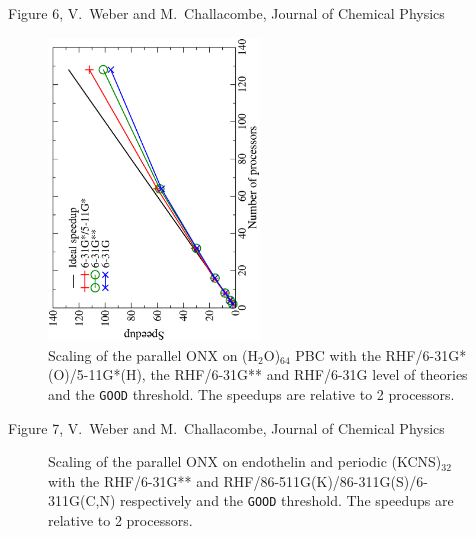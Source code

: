 \documentclass[prl,preprint,doublespace]{revtex4} %
\begin{document}
{\begin{figure}[h]
\end{figure}

\clearpage
Figure 6, V.~Weber  and M.~Challacombe, Journal of Chemical Physics \\[1.cm]
\begin{figure}[h]
  \caption{\protect
    Scaling of the parallel ONX on (H$_2$O)$_{64}$ PBC with the RHF/6-31G*(O)/5-11G*(H),
    the RHF/6-31G** and RHF/6-31G level of theories and the {\tt GOOD} threshold.
    The speedups are relative to 2 processors.
  }\label{fig:h2o_pbc_64}
\begin{center}

  \includegraphics[angle=-90,width=0.5\textwidth]{h2o_pbc_64}
\end{center}

\end{figure}

\clearpage
Figure 7, V.~Weber  and M.~Challacombe, Journal of Chemical Physics \\[1.cm]
\begin{figure}[h]
  \caption{\protect
    Scaling of the parallel ONX on endothelin and periodic (KCNS)$_{32}$ with
    the RHF/6-31G** and RHF/86-511G(K)/86-311G(S)/6-311G(C,N)
    respectively and the {\tt GOOD} threshold.
    The speedups are relative to 2 processors.
  }\label{fig:Endothelin_KCNS}
\begin{center}


\end{center}
\end{figure}}
\end{document}
